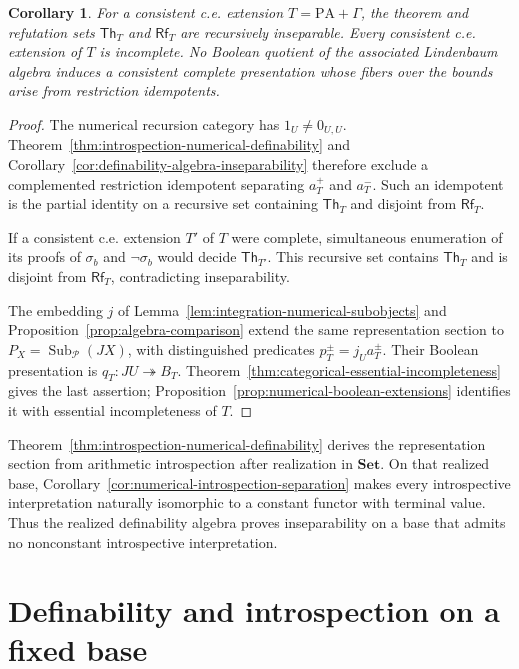 \documentclass[11pt]{article}
\newtheorem{corollary}[theorem]{Corollary}
\theoremstyle{definition}
\theoremstyle{remark}
\begin{document}
\begin{corollary}\label{cor:introspection-realized-incompleteness}
For a consistent c.e. extension $T=\mathrm{PA}+\Gamma$, the
theorem and refutation sets $\mathsf{Th}_T$ and $\mathsf{Rf}_T$
are recursively inseparable.
Every consistent c.e. extension of $T$ is incomplete.
No Boolean quotient of the associated Lindenbaum algebra induces
a consistent complete presentation whose fibers over the bounds
arise from restriction idempotents.
\end{corollary}
\begin{proof}
The numerical recursion category has $1_U\ne0_{U,U}$.
Theorem~\ref{thm:introspection-numerical-definability} and
Corollary~\ref{cor:definability-algebra-inseparability} therefore
exclude a complemented restriction idempotent separating
$a_T^+$ and $a_T^-$. Such an idempotent is the partial identity
on a recursive set containing $\mathsf{Th}_T$ and disjoint
from $\mathsf{Rf}_T$.

If a consistent c.e. extension $T'$ of $T$ were complete,
simultaneous enumeration of its proofs of $\sigma_b$ and
$\neg\sigma_b$ would decide $\mathsf{Th}_{T'}$.
This recursive set contains $\mathsf{Th}_T$ and is disjoint
from $\mathsf{Rf}_T$, contradicting inseparability.

The embedding $j$ of
Lemma~\ref{lem:integration-numerical-subobjects} and
Proposition~\ref{prop:algebra-comparison} extend the same
representation section to $P_X=\operatorname{Sub}_{\mathcal P}(JX)$,
with distinguished predicates $p_T^\pm=j_Ua_T^\pm$.
Their Boolean presentation is $q_T:JU\twoheadrightarrow B_T$.
Theorem~\ref{thm:categorical-essential-incompleteness} gives the
last assertion; Proposition~\ref{prop:numerical-boolean-extensions}
identifies it with essential incompleteness of $T$.
\end{proof}

Theorem~\ref{thm:introspection-numerical-definability} derives the
representation section from arithmetic introspection after
realization in $\mathbf{Set}$. On that realized base,
Corollary~\ref{cor:numerical-introspection-separation} makes every
introspective interpretation naturally isomorphic to a constant
functor with terminal value. Thus the realized definability algebra
proves inseparability on a base that admits no nonconstant
introspective interpretation.

\appendix
\section{Definability and introspection on a fixed base}
\label{sec:introspection-representation-appendix}
\end{document}
